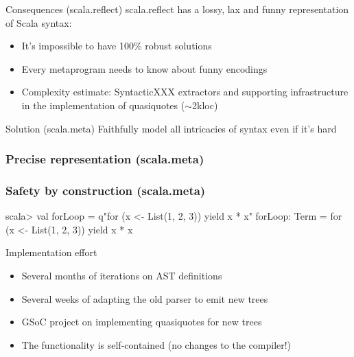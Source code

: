 \documentclass[svgnames,dvipsnames,hyperref={bookmarks=false},usepdftitle=false]{beamer}
\begin{document}
\begin{frame}{Consequences (scala.reflect)}
scala.reflect has a lossy, lax and funny representation of Scala syntax:
\begin{itemize}
\item It's impossible to have 100\% robust solutions
\item Every metaprogram needs to know about funny encodings
\item Complexity estimate: SyntacticXXX extractors and supporting infrastructure
in the implementation of quasiquotes ($\sim$2kloc)
\end{itemize}
\end{frame}

\begin{frame}{Solution (scala.meta)}
Faithfully model all intricacies of syntax even if it's hard
\end{frame}

\begin{frame}[fragile]
\frametitle<1-4>{Precise representation (scala.meta)}
\frametitle<5>{Safety by construction (scala.meta)}
\begin{semiverbatim}
scala> val forLoop = q"for (x <- List(1, 2, 3)) yield x * x"
forLoop: Term = \alert<2>{for} (\alert<3>{x <- \alert<5>{List}(1, 2, 3)}) \alert<2>{yield} \alert<4>{x * x}

\end{semiverbatim}
\end{frame}

\begin{frame}{Implementation effort}
\begin{itemize}
\item Several months of iterations on AST definitions
\item Several weeks of adapting the old parser to emit new trees
\item GSoC project on implementing quasiquotes for new trees
\item The functionality is self-contained (no changes to the compiler!)
\end{itemize}
\end{frame}
\end{document}
